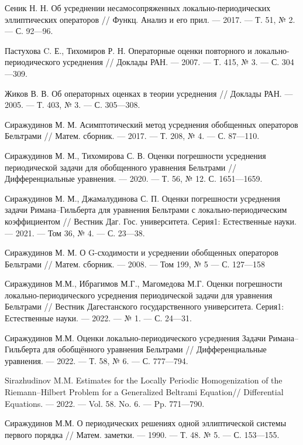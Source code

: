 \begin{thebibliography}{111}
  Сеник Н. Н. Об усреднении несамосопряженных локально-периодических эллиптических операторов // Функц. Анализ и его прил. --- 2017. --- Т. 51, № 2. --- С. 92---96.

  Пастухова C. Е., Тихомиров Р. Н. Операторные оценки повторного  и локально-периодического  усреднения // Доклады РАН. --- 2007. --- Т. 415, № 3. ---  С. 304---309.

  Жиков В. В. Об операторных оценках в теории усреднения // Доклады РАН. --- 2005. --- Т. 403, № 3. --- С. 305---308.

  Сиражудинов М. М. Асимптотический метод усреднения обобщенных  операторов Бельтрами // Матем. сборник. --- 2017. --- Т. 208, № 4. --- С. 87---110.

  Сиражудинов М. М., Тихомирова С. В. Оценки погрешности усреднения периодической задачи для обобщенного уравнения Бельтрами // Дифференциальные уравнения. --- 2020. --- Т. 56, № 12.  С. 1651---1659.

  Сиражудинов М. М., Джамалудинова С. П. Оценки погрешности усреднения задачи Римана–Гильберта для уравнения Бельтрами с локально-периодическим коэффициентом //  Вестник Даг. Гос. университета. Серия1: Естественные науки. --- 2021. --- Том 36, № 4. --- С. 23---38.

  Сиражудинов М. М. О G-сходимости и усреднении обобщенных операторов Бельтрами // Матем. сборник. --- 2008. --- Том 199, № 5 --- С. 127---158

  	Сиражудинов М.М., Ибрагимов М.Г., Магомедова М.Г. Оценки погрешности локально-периодического усреднения периодической задачи для уравнения Бельтрами // Вестник Дагестанского государственного университета. Серия1: Естественные науки. --- 2022. --- № 1. --- С. 24---31.

  	Сиражудинов М.М. Оценки локально-периодического усреднения Задачи Римана–Гильберта для обобщённого уравнения Бельтрами // Дифференциальные уравнения. --- 2022. --- Т. 58, № 6. --- С. 777---794.

  	Sirazhudinov M.M. Estimates for the Locally Periodic Homogenization of the Riemann–Hilbert Problem for a Generalized Beltrami Equation// Differential Equations. --- 2022. --- Vol. 58. No. 6. --- Pp. 771---790.

   Сиражудинов М.М. О периодических решениях одной
  	эллиптической системы первого порядка //  Матем. заметки.
  	--- 1990.  --- Т. 48. № 5. --- С. 153---155.



\end{thebibliography}
